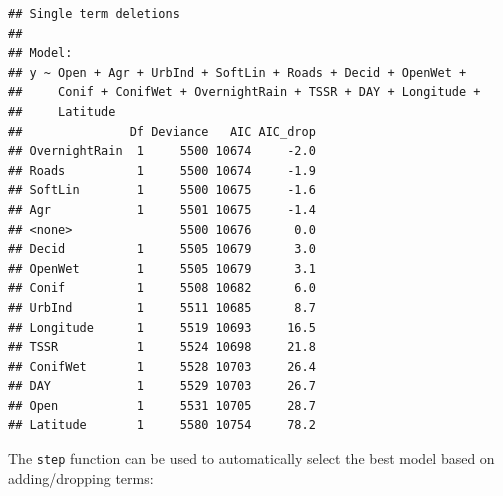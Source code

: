 \documentclass[12pt,]{book}
\newenvironment{Shaded}{\begin{snugshade}}{\end{snugshade}}
\newcommand{\CommentTok}[1]{\textcolor[rgb]{0.56,0.35,0.01}{\textit{#1}}}
\newcommand{\DataTypeTok}[1]{\textcolor[rgb]{0.13,0.29,0.53}{#1}}
\newcommand{\DecValTok}[1]{\textcolor[rgb]{0.00,0.00,0.81}{#1}}
\newcommand{\KeywordTok}[1]{\textcolor[rgb]{0.13,0.29,0.53}{\textbf{#1}}}
\newcommand{\NormalTok}[1]{#1}
\newcommand{\OperatorTok}[1]{\textcolor[rgb]{0.81,0.36,0.00}{\textbf{#1}}}
\newcommand{\StringTok}[1]{\textcolor[rgb]{0.31,0.60,0.02}{#1}}
\begin{document}
\begin{Shaded}
\end{Shaded}

\begin{verbatim}
## Single term deletions
## 
## Model:
## y ~ Open + Agr + UrbInd + SoftLin + Roads + Decid + OpenWet + 
##     Conif + ConifWet + OvernightRain + TSSR + DAY + Longitude + 
##     Latitude
##               Df Deviance   AIC AIC_drop
## OvernightRain  1     5500 10674     -2.0
## Roads          1     5500 10674     -1.9
## SoftLin        1     5500 10675     -1.6
## Agr            1     5501 10675     -1.4
## <none>               5500 10676      0.0
## Decid          1     5505 10679      3.0
## OpenWet        1     5505 10679      3.1
## Conif          1     5508 10682      6.0
## UrbInd         1     5511 10685      8.7
## Longitude      1     5519 10693     16.5
## TSSR           1     5524 10698     21.8
## ConifWet       1     5528 10703     26.4
## DAY            1     5529 10703     26.7
## Open           1     5531 10705     28.7
## Latitude       1     5580 10754     78.2
\end{verbatim}

The \texttt{step} function can be used to automatically select the best model
based on adding/dropping terms:
\end{document}
